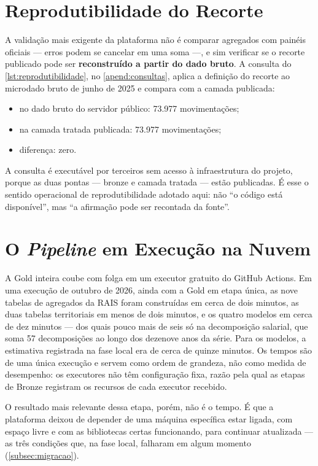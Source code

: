 \section{Reprodutibilidade do Recorte}
\label{sec:reprodutibilidade}

A validação mais exigente da plataforma não é comparar agregados com painéis oficiais --- erros podem se cancelar em uma soma ---, e sim verificar se o recorte publicado pode ser \textbf{reconstruído a partir do dado bruto}. A consulta do \autoref{lst:reprodutibilidade}, no \autoref{apend:consultas}, aplica a definição do recorte ao microdado bruto de junho de 2025 e compara com a camada publicada:

\begin{itemize}
    \item no dado bruto do servidor público: 73.977 movimentações;
    \item na camada tratada publicada: 73.977 movimentações;
    \item diferença: zero.
\end{itemize}

A consulta é executável por terceiros sem acesso à infraestrutura do projeto, porque as duas pontas --- bronze e camada tratada --- estão publicadas. É esse o sentido operacional de reprodutibilidade adotado aqui: não ``o código está disponível'', mas ``a afirmação pode ser recontada da fonte''.

\section{O \textit{Pipeline} em Execução na Nuvem}
\label{sec:execucao-nuvem}

A Gold inteira coube com folga em um executor gratuito do GitHub Actions. Em uma execução de outubro de 2026, ainda com a Gold em etapa única, as nove tabelas de agregados da RAIS foram construídas em cerca de dois minutos, as duas tabelas territoriais em menos de dois minutos, e os quatro modelos em cerca de dez minutos --- dos quais pouco mais de seis só na decomposição salarial, que soma 57 decomposições ao longo dos dezenove anos da série. Para os modelos, a estimativa registrada na fase local era de cerca de quinze minutos. Os tempos são de uma única execução e servem como ordem de grandeza, não como medida de desempenho: os executores não têm configuração fixa, razão pela qual as etapas de Bronze registram os recursos de cada executor recebido.

O resultado mais relevante dessa etapa, porém, não é o tempo. É que a plataforma deixou de depender de uma máquina específica estar ligada, com espaço livre e com as bibliotecas certas funcionando, para continuar atualizada --- as três condições que, na fase local, falharam em algum momento (\autoref{subsec:migracao}).

